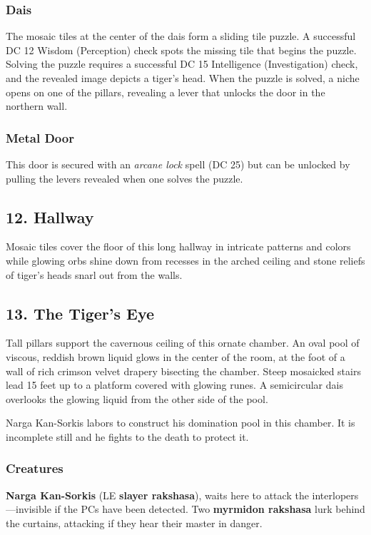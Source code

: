 \documentclass[10pt,a4paper,twoside,bg=print,twocolumn,openany,nodeprecatedcode]{dndbook}
\begin{document}
\subsubsection{Dais}
The mosaic tiles at the center of the dais form a sliding tile puzzle. A successful DC 12 Wisdom (Perception) check spots the missing tile that begins the puzzle. Solving the puzzle requires a successful DC 15 Intelligence (Investigation) check, and the revealed image depicts a tiger's head. When the puzzle is solved, a niche opens on one of the pillars, revealing a lever that unlocks the door in the northern wall.

\subsubsection{Metal Door}
This door is secured with an \textit{arcane lock} spell (DC 25) but can be unlocked by pulling the levers revealed when one solves the puzzle.

\subsection{12. Hallway}
\begin{DndReadAloud}{}
Mosaic tiles cover the floor of this long hallway in intricate patterns and colors while glowing orbs shine down from recesses in the arched ceiling and stone reliefs of tiger's heads snarl out from the walls.

\end{DndReadAloud}

\subsection{13. The Tiger's Eye}
\begin{DndReadAloud}{}
Tall pillars support the cavernous ceiling of this ornate chamber. An oval pool of viscous, reddish brown liquid glows in the center of the room, at the foot of a wall of rich crimson velvet drapery bisecting the chamber. Steep mosaicked stairs lead 15 feet up to a platform covered with glowing runes. A semicircular dais overlooks the glowing liquid from the other side of the pool.

\end{DndReadAloud}

Narga Kan-Sorkis labors to construct his domination pool in this chamber. It is incomplete still and he fights to the death to protect it.

\subsubsection{Creatures}
\textbf{Narga Kan-Sorkis} (LE \textbf{slayer rakshasa}), waits here to attack the interlopers—invisible if the PCs have been detected. Two \textbf{myrmidon rakshasa} lurk behind the curtains, attacking if they hear their master in danger.
\end{document}
